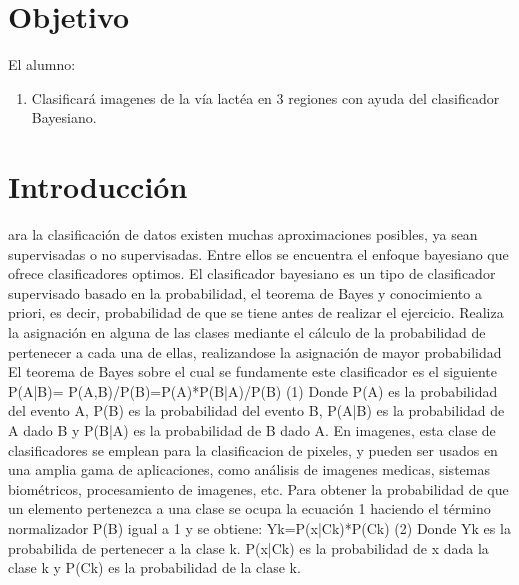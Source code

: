 \documentclass[10pt,journal,compsoc]{IEEEtran}
\begin{document}
\section{Objetivo}

El alumno:

\begin{enumerate}
  \item Clasificará imagenes de la vía lactéa en 3 regiones con ayuda del clasificador Bayesiano.
\end{enumerate}



\section{Introducción}
 
ara la clasificación de datos existen muchas aproximaciones posibles, ya sean supervisadas o no supervisadas. Entre ellos se encuentra el enfoque bayesiano que ofrece clasificadores optimos.
El clasificador bayesiano es un tipo de clasificador supervisado basado en la probabilidad, el teorema de Bayes y conocimiento a priori, es decir, probabilidad de que se tiene antes de realizar el ejercicio. Realiza la asignación en alguna de las clases mediante el cálculo de la probabilidad de pertenecer a cada una de ellas, realizandose la asignación de mayor probabilidad
El teorema de Bayes sobre el cual se fundamente este clasificador es el siguiente
P(A|B)= P(A,B)/P(B)=P(A)*P(B|A)/P(B)						(1)
Donde P(A) es la probabilidad del evento A, P(B) es la probabilidad del evento B, P(A|B) es la probabilidad de A dado B y P(B|A) es la probabilidad de B dado A.
En imagenes, esta clase de clasificadores se emplean para la clasificacion de pixeles, y pueden ser usados en una amplia gama de aplicaciones, como análisis de imagenes medicas, sistemas biométricos, procesamiento de imagenes, etc.
Para obtener la probabilidad de que un elemento pertenezca a una clase se ocupa la ecuación 1 haciendo el término normalizador P(B) igual a 1 y se obtiene:
Yk=P(x|Ck)*P(Ck)					(2)
Donde Yk es la probabilida de pertenecer a la clase k.
P(x|Ck) es la probabilidad de x dada la clase k y P(Ck) es la probabilidad de la clase k.
\end{document}
